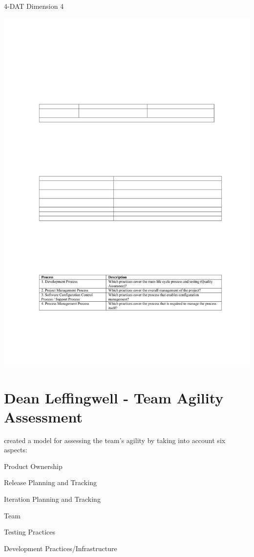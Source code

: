 \begin{table}[H]
\caption{4-DAT Dimension 4}
\label{fig:dimension4}
\centerline{\includegraphics[scale=0.8]{include/relatedwork/fig/qumer_dimension4.pdf}}
\end{table}


\section{Dean Leffingwell - Team Agility Assessment} %
\citet{Leffingwell} created a model for assessing the team's agility by taking into account six aspects: 
\begin{inparaenum} [a\upshape)]
\item Product Ownership
\item Release Planning and Tracking
\item Iteration Planning and Tracking
\item Team
\item Testing Practices
\item Development Practices/Infrastructure
\end{inparaenum}

